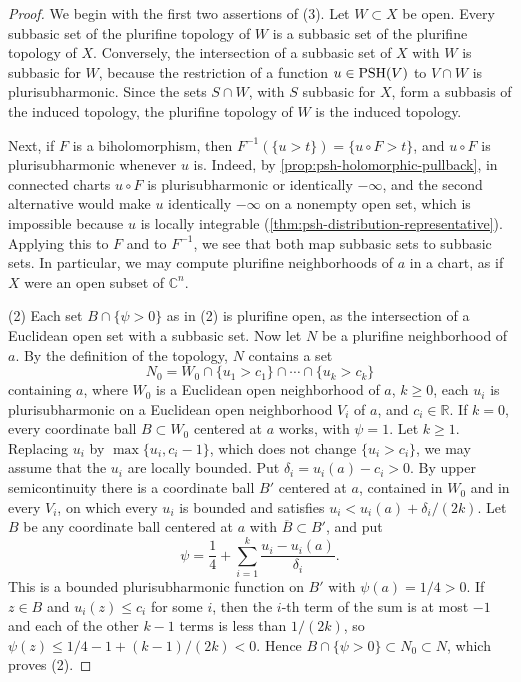 \begin{proof}
We begin with the first two assertions of (3). Let $W\subset X$ be open. Every subbasic set of the plurifine topology of $W$ is a subbasic set of the plurifine topology of $X$. Conversely, the intersection of a subbasic set of $X$ with $W$ is subbasic for $W$, because the restriction of a function $u\in\mathrm{PSH}(V)$ to $V\cap W$ is plurisubharmonic. Since the sets $S\cap W$, with $S$ subbasic for $X$, form a subbasis of the induced topology, the plurifine topology of $W$ is the induced topology.

Next, if $F$ is a biholomorphism, then $F^{-1}(\{u>t\})=\{u\circ F>t\}$, and $u\circ F$ is plurisubharmonic whenever $u$ is. Indeed, by \cref{prop:psh-holomorphic-pullback}, in connected charts $u\circ F$ is plurisubharmonic or identically $-\infty$, and the second alternative would make $u$ identically $-\infty$ on a nonempty open set, which is impossible because $u$ is locally integrable (\cref{thm:psh-distribution-representative}). Applying this to $F$ and to $F^{-1}$, we see that both map subbasic sets to subbasic sets. In particular, we may compute plurifine neighborhoods of $a$ in a chart, as if $X$ were an open subset of $\mathbb C^n$.

(2) Each set $B\cap\{\psi>0\}$ as in (2) is plurifine open, as the intersection of a Euclidean open set with a subbasic set. Now let $N$ be a plurifine neighborhood of $a$. By the definition of the topology, $N$ contains a set
\[
 N_0=W_0\cap\{u_1>c_1\}\cap\cdots\cap\{u_k>c_k\}
\]
containing $a$, where $W_0$ is a Euclidean open neighborhood of $a$, $k\ge0$, each $u_i$ is plurisubharmonic on a Euclidean open neighborhood $V_i$ of $a$, and $c_i\in\mathbb R$. If $k=0$, every coordinate ball $B\subset W_0$ centered at $a$ works, with $\psi=1$. Let $k\ge1$. Replacing $u_i$ by $\max\{u_i,c_i-1\}$, which does not change $\{u_i>c_i\}$, we may assume that the $u_i$ are locally bounded. Put $\delta_i=u_i(a)-c_i>0$. By upper semicontinuity there is a coordinate ball $B'$ centered at $a$, contained in $W_0$ and in every $V_i$, on which every $u_i$ is bounded and satisfies $u_i<u_i(a)+\delta_i/(2k)$. Let $B$ be any coordinate ball centered at $a$ with $\overline B\subset B'$, and put
\[
 \psi=\frac14+\sum_{i=1}^k\frac{u_i-u_i(a)}{\delta_i}.
\]
This is a bounded plurisubharmonic function on $B'$ with $\psi(a)=1/4>0$. If $z\in B$ and $u_i(z)\le c_i$ for some $i$, then the $i$-th term of the sum is at most $-1$ and each of the other $k-1$ terms is less than $1/(2k)$, so $\psi(z)\le1/4-1+(k-1)/(2k)<0$. Hence $B\cap\{\psi>0\}\subset N_0\subset N$, which proves (2).


\end{proof}
